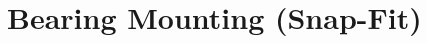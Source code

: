 \documentclass[../main.tex]{subfiles}
\begin{document}
\section{Bearing Mounting (Snap-Fit)} \label{snapFit}
\end{document}
